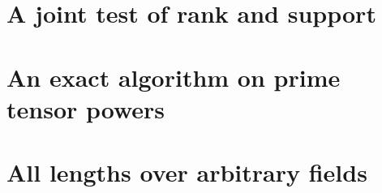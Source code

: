 \documentclass[11pt]{article}
\begin{document}
\maketitle

\begin{abstract}
The minimum number of binary linear gates for a finite abelian Fourier
transform of order $N$ is $N(\log N)^{1/2+o(1)}$. This holds over every
field in which $N$ is invertible and which contains the required roots
of unity. The same cost per transform holds for any number of independent
inputs, even when gates can mix them. Formal polynomial multiplication
has the same logarithmic exponent over every field, including for
batches of independent products.
\end{abstract}


\medskip
{\small\tableofcontents}
\clearpage

\part{A joint test of rank and support}\label{part:lower}



\part{An exact algorithm on prime tensor powers}\label{part:finite}



\part{All lengths over arbitrary fields}\label{part:all}






\end{document}
